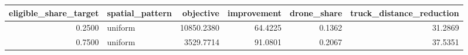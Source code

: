 \begin{tabular}{rlrrrr}
\toprule
eligible_share_target & spatial_pattern & objective & improvement & drone_share & truck_distance_reduction \\
\midrule
0.2500 & uniform & 10850.2380 & 64.4225 & 0.1362 & 31.2869 \\
0.7500 & uniform & 3529.7714 & 91.0801 & 0.2067 & 37.5351 \\
\bottomrule
\end{tabular}
